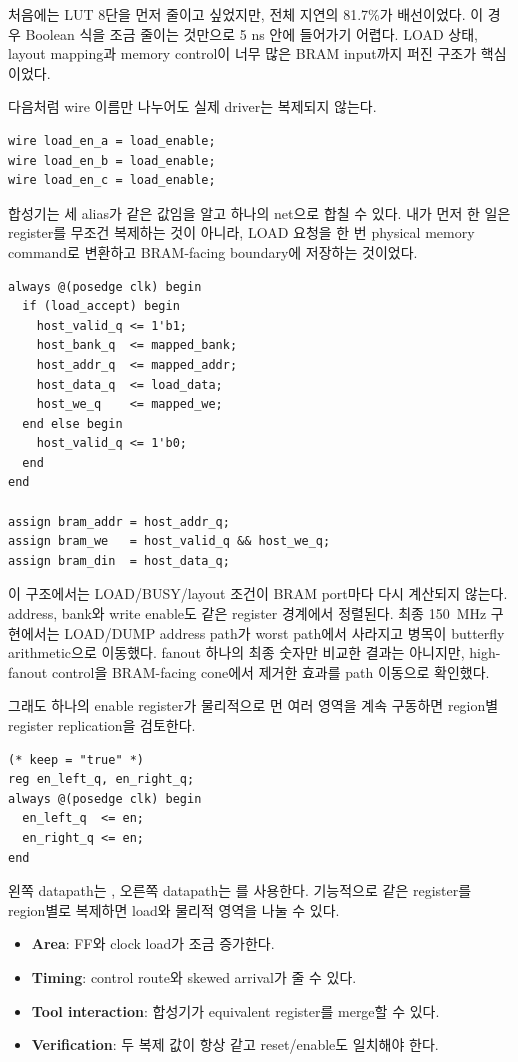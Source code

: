 처음에는 LUT 8단을 먼저 줄이고 싶었지만, 전체 지연의 81.7\%가 배선이었다.
이 경우 Boolean 식을 조금 줄이는 것만으로 5 ns 안에 들어가기 어렵다. LOAD 상태,
layout mapping과 memory control이 너무 많은 BRAM input까지 퍼진 구조가 핵심이었다.

다음처럼 wire 이름만 나누어도 실제 driver는 복제되지 않는다.

\begin{lstlisting}
wire load_en_a = load_enable;
wire load_en_b = load_enable;
wire load_en_c = load_enable;
\end{lstlisting}

합성기는 세 alias가 같은 값임을 알고 하나의 net으로 합칠 수 있다. 내가 먼저 한
일은 register를 무조건 복제하는 것이 아니라, LOAD 요청을 한 번 physical memory
command로 변환하고 BRAM-facing boundary에 저장하는 것이었다.

\begin{lstlisting}
always @(posedge clk) begin
  if (load_accept) begin
    host_valid_q <= 1'b1;
    host_bank_q  <= mapped_bank;
    host_addr_q  <= mapped_addr;
    host_data_q  <= load_data;
    host_we_q    <= mapped_we;
  end else begin
    host_valid_q <= 1'b0;
  end
end

assign bram_addr = host_addr_q;
assign bram_we   = host_valid_q && host_we_q;
assign bram_din  = host_data_q;
\end{lstlisting}

이 구조에서는 LOAD/BUSY/layout 조건이 BRAM port마다 다시 계산되지 않는다.
address, bank와 write enable도 같은 register 경계에서 정렬된다. 최종 150~MHz
구현에서는 LOAD/DUMP address path가 worst path에서 사라지고 병목이 butterfly
arithmetic으로 이동했다. fanout 하나의 최종 숫자만 비교한 결과는 아니지만,
high-fanout control을 BRAM-facing cone에서 제거한 효과를 path 이동으로 확인했다.

그래도 하나의 enable register가 물리적으로 먼 여러 영역을 계속 구동하면
region별 register replication을 검토한다.

\begin{lstlisting}
(* keep = "true" *)
reg en_left_q, en_right_q;
always @(posedge clk) begin
  en_left_q  <= en;
  en_right_q <= en;
end
\end{lstlisting}

왼쪽 datapath는 , 오른쪽 datapath는
를 사용한다. 기능적으로 같은 register를 region별로
복제하면 load와 물리적 영역을 나눌 수 있다.

\begin{itemize}
  \item \textbf{Area}: FF와 clock load가 조금 증가한다.
  \item \textbf{Timing}: control route와 skewed arrival가 줄 수 있다.
  \item \textbf{Tool interaction}: 합성기가 equivalent register를 merge할 수 있다.
  \item \textbf{Verification}: 두 복제 값이 항상 같고 reset/enable도 일치해야 한다.
\end{itemize}

